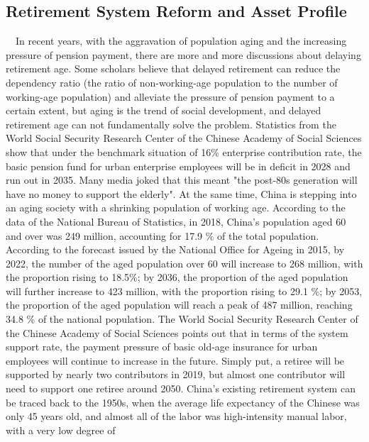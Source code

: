 \documentclass{article}
\begin{document}
    \subsection{Retirement System Reform and Asset Profile}
        ~\
        In recent years, with the aggravation of population aging and the increasing pressure of pension payment, 
        there are more and more discussions about delaying retirement age. Some scholars believe that delayed retirement 
        can reduce the dependency ratio (the ratio of non-working-age population to the number of working-age population) 
        and alleviate the pressure of pension payment to a certain extent, but aging is the trend of social development, 
        and delayed retirement age can not fundamentally solve the problem. Statistics from the World Social Security Research 
        Center of the Chinese Academy of Social Sciences show that under the benchmark situation of 16\% enterprise 
        contribution rate, the basic pension fund for urban enterprise employees will be in deficit in 2028 and run out in 2035. 
        Many media joked that this meant "the post-80s generation will have no money to support the elderly".
        At the same time, China is stepping into an aging society with a shrinking population of working age. 
        According to the data of the National Bureau of Statistics, in 2018, China's population aged 60 and over was 249 million, 
        accounting for 17.9 \% of the total population. According to the forecast issued by the National Office for Ageing in 2015, 
        by 2022, the number of the aged population over 60 will increase to 268 million, with the proportion rising to 18.5\%; 
        by 2036, the proportion of the aged population will further increase to 423 million, with the proportion rising to 29.1 \%; 
        by 2053, the proportion of the aged population will reach a peak of 487 million, reaching 34.8 \% of the national population.
        The World Social Security Research Center of the Chinese Academy of Social Sciences points out that in terms of the system 
        support rate, the payment pressure of basic old-age insurance for urban employees will continue to increase in the future. 
        Simply put, a retiree will be supported by nearly two contributors in 2019, but almost one contributor will need to support 
        one retiree around 2050. China's existing retirement system can be traced back to the 1950s, when the average life expectancy 
        of the Chinese was only 45 years old, and almost all of the labor was high-intensity manual labor, with a very low degree of 
\end{document}
